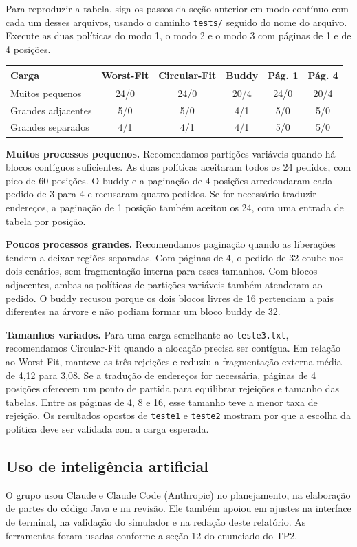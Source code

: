 \documentclass[11pt,a4paper]{article}
\newcommand{\arquivo}[1]{\texttt{#1}}
\begin{document}
Para reproduzir a tabela, siga os passos da seção anterior em modo
contínuo com cada um desses arquivos, usando o caminho \arquivo{tests/}
seguido do nome do arquivo. Execute as duas políticas do modo 1,
o modo 2 e o modo 3 com páginas de 1 e de 4 posições.

\begin{center}
\label{tab:cargas}
\small
\begin{tabular}{@{}lccccc@{}}
\toprule
Carga & Worst-Fit & Circular-Fit & Buddy & Pág. 1 & Pág. 4 \\
\midrule
Muitos pequenos   & 24/0 & 24/0 & 20/4 & 24/0 & 20/4 \\
Grandes adjacentes &  5/0 &  5/0 &  4/1 &  5/0 &  5/0 \\
Grandes separados  &  4/1 &  4/1 &  4/1 &  5/0 &  5/0 \\
\bottomrule
\end{tabular}
\end{center}

\textbf{Muitos processos pequenos.} Recomendamos partições variáveis
quando há blocos contíguos suficientes. As duas políticas aceitaram todos
os 24 pedidos, com pico de 60 posições. O buddy e a paginação de 4
posições arredondaram cada pedido de 3 para 4 e recusaram quatro pedidos.
Se for necessário traduzir endereços, a paginação de 1 posição também
aceitou os 24, com uma entrada de tabela por posição.

\textbf{Poucos processos grandes.} Recomendamos paginação quando as
liberações tendem a deixar regiões separadas. Com páginas de 4, o pedido
de 32 coube nos dois cenários, sem fragmentação interna para esses
tamanhos. Com blocos adjacentes, ambas as políticas de partições variáveis
também atenderam ao pedido. O buddy recusou porque os dois blocos livres
de 16 pertenciam a pais diferentes na árvore e não podiam formar um
bloco buddy de 32.

\textbf{Tamanhos variados.} Para uma carga semelhante ao
\arquivo{teste3.txt}, recomendamos Circular-Fit quando a alocação precisa
ser contígua. Em relação ao Worst-Fit, manteve as três rejeições e reduziu
a fragmentação externa média de 4,12 para 3,08. Se a tradução de endereços
for necessária, páginas de 4 posições oferecem um ponto de partida para
equilibrar rejeições e tamanho das tabelas. Entre as páginas de 4, 8 e 16,
esse tamanho teve a menor taxa de rejeição. Os resultados opostos de
\arquivo{teste1} e \arquivo{teste2} mostram por que a escolha da política
deve ser validada com a carga esperada.

\subsection*{Uso de inteligência artificial}

O grupo usou Claude e Claude Code (Anthropic) no planejamento, na elaboração
de partes do código Java e na revisão. Ele também apoiou em ajustes na
interface de terminal, na validação do simulador e na redação deste relatório. As ferramentas foram usadas
conforme a seção 12 do enunciado do TP2.
\end{document}
